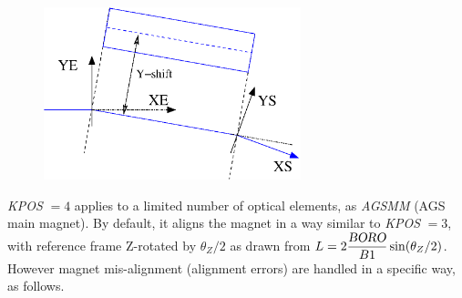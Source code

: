 \begin{figure}[h]
\begin{center}
\includegraphics[height=5cm]{FigKPOS3.eps}

\end{center}
\end{figure}

\noindent \textsl{KPOS} $=4 $ applies to a limited number of optical elements, as 
\textsl{AGSMM} (AGS main magnet).  
By default, it aligns the magnet in a way similar 
to  \textsl{KPOS} $=3 $, with reference frame Z-rotated by $\theta_Z/2$ as drawn from $ L = 
2 \dfrac{\textsl{BORO}}{B1} \sin({\theta_Z}/{2})$. However magnet mis-alignment (alignment errors) are handled in a 
specific way, as follows. 



